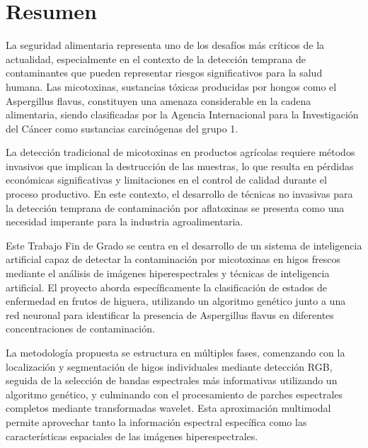 \renewcommand{\keywords}{{\itshape \bfseries Palabras clave - }}
\chapter*{Resumen} 

La seguridad alimentaria representa uno de los desafíos más críticos de la actualidad, especialmente en el contexto de la detección temprana de contaminantes que pueden representar riesgos significativos para la salud humana. Las micotoxinas, sustancias tóxicas producidas por hongos como el Aspergillus flavus, constituyen una amenaza considerable en la cadena alimentaria, siendo clasificadas por la Agencia Internacional para la Investigación del Cáncer como sustancias carcinógenas del grupo 1.

\vspace{5mm}

La detección tradicional de micotoxinas en productos agrícolas requiere métodos invasivos que implican la destrucción de las muestras, lo que resulta en pérdidas económicas significativas y limitaciones en el control de calidad durante el proceso productivo. En este contexto, el desarrollo de técnicas no invasivas para la detección temprana de contaminación por aflatoxinas se presenta como una necesidad imperante para la industria agroalimentaria.

\vspace{5mm}

Este Trabajo Fin de Grado se centra en el desarrollo de un sistema de inteligencia artificial capaz de detectar la contaminación por micotoxinas en higos frescos mediante el análisis de imágenes hiperespectrales y técnicas de inteligencia artificial. El proyecto aborda específicamente la clasificación de estados de enfermedad en frutos de higuera, utilizando un algoritmo genético junto a una red neuronal para identificar la presencia de Aspergillus flavus en diferentes concentraciones de contaminación.

\vspace{5mm}

La metodología propuesta se estructura en múltiples fases, comenzando con la localización y segmentación de higos individuales mediante detección RGB, seguida de la selección de bandas espectrales más informativas utilizando un algoritmo genético, y culminando con el procesamiento de parches espectrales completos mediante transformadas wavelet. Esta aproximación multimodal permite aprovechar tanto la información espectral específica como las características espaciales de las imágenes hiperespectrales.

